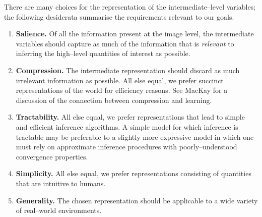 There are many choices for the representation of the
intermediate--level variables; the following desiderata summarise the
requirements relevant to our goals.
\begin{enumerate}
  \item{\textbf{Salience.} Of all the information present at the
    image level, the intermediate variables should capture as much of
    the information that is \textit{relevant} to inferring the
    high--level quantities of interest as possible.}
  \item{\textbf{Compression.} The intermediate representation should
    discard as much irrelevant information as possible. All else
    equal, we prefer succinct representations of the world for
    efficiency reasons. See MacKay \cite{MacKay2003} for a discussion
    of the connection between compression and learning.}
  \item{\textbf{Tractability.} All else equal, we prefer
    representations that lead to simple and efficient inference
    algorithms. A simple model for which inference is tractable
    may be preferable to a slightly more expressive model in which
    one must rely on approximate inference procedures with
    poorly--understood convergence properties.}
  \item{\textbf{Simplicity.} All else equal, we prefer representations
    consisting of quantities that are intuitive to humans.}
  \item{\textbf{Generality.} The chosen representation should be
    applicable to a wide variety of real--world environments.}
\end{enumerate}

